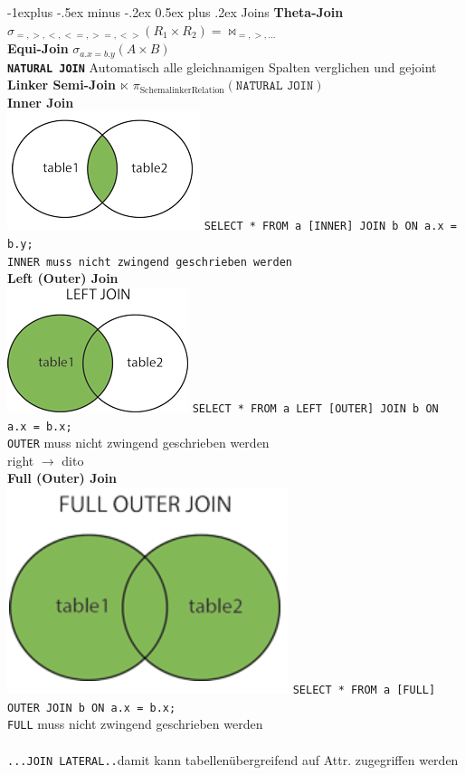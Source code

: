 \documentclass[10pt,landscape,a4paper]{article}
\makeatletter
\renewcommand{\subsection}{\@startsection{subsection}{2}{0mm}%
                                {-1explus -.5ex minus -.2ex}%
                                {0.5ex plus .2ex}%
                                {\normalfont\small\bfseries}}
\newcommand{\sql}[1]{\texttt{#1}}
\makeatother
\begin{document}
\begin{multicols*}{3}
\subsection{Joins}
\textbf{Theta-Join} $\sigma_{=, >,<, <=, >=, <>}(R_1 \times R_2)=\bowtie_{=, >, ...}$\\
\textbf{Equi-Join} $\sigma_{a.x = b.y}(A \times B)$\\
\textbf{\texttt{NATURAL JOIN}} Automatisch alle gleichnamigen Spalten verglichen und gejoint\\
\textbf{Linker Semi-Join $\ltimes$} $\pi_{\mathrm{Schema linker Relation}}\mathrm{(\texttt{NATURAL JOIN})}$\\
\textbf{Inner Join}\\
\includegraphics[scale=.1]{innerjoin.PNG}
\sql{SELECT * FROM a [INNER] JOIN b ON a.x = b.y;}\\
\texttt{INNER muss nicht zwingend geschrieben werden}\\
\textbf{Left (Outer) Join} {\tiny {}}\\
\includegraphics[scale=.1]{img_leftjoin.png}
\texttt{SELECT * FROM a LEFT [OUTER] JOIN b ON a.x = b.x;}\\
\texttt{OUTER} muss nicht zwingend geschrieben werden\\
right $\rightarrow$ dito\\
\textbf{Full (Outer) Join} {\tiny {}}\\
\includegraphics[scale=.1]{fullouterjoin.PNG}
\texttt{SELECT * FROM a [FULL] OUTER JOIN b ON a.x = b.x;}\\
\texttt{FULL} muss nicht zwingend geschrieben werden\\ \\
\texttt{...JOIN LATERAL..}damit kann tabellenübergreifend auf Attr. zugegriffen werden

\end{multicols*}
\end{document}
